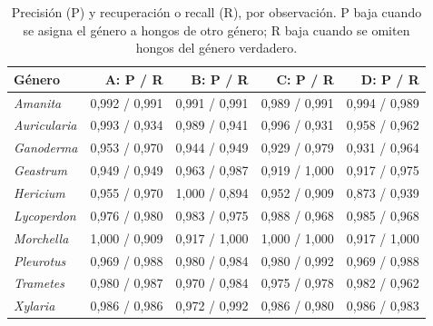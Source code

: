 \begin{table}[H]
\centering
\footnotesize
\caption{Precisión (P) y recuperación o recall (R), por observación. P baja cuando se asigna el género a hongos de otro género; R baja cuando se omiten hongos del género verdadero.}
\label{tab:precision-recall}
\begin{tabularx}{\linewidth}{Y r r r r}
\toprule
\textbf{Género} & \textbf{A: P / R} & \textbf{B: P / R} & \textbf{C: P / R} & \textbf{D: P / R}\\
\midrule
\textit{Amanita} & 0,992 / 0,991 & 0,991 / 0,991 & 0,989 / 0,991 & 0,994 / 0,989\\
\textit{Auricularia} & 0,993 / 0,934 & 0,989 / 0,941 & 0,996 / 0,931 & 0,958 / 0,962\\
\textit{Ganoderma} & 0,953 / 0,970 & 0,944 / 0,949 & 0,929 / 0,979 & 0,931 / 0,964\\
\textit{Geastrum} & 0,949 / 0,949 & 0,963 / 0,987 & 0,919 / 1,000 & 0,917 / 0,975\\
\textit{Hericium} & 0,955 / 0,970 & 1,000 / 0,894 & 0,952 / 0,909 & 0,873 / 0,939\\
\textit{Lycoperdon} & 0,976 / 0,980 & 0,983 / 0,975 & 0,988 / 0,968 & 0,985 / 0,968\\
\textit{Morchella} & 1,000 / 0,909 & 0,917 / 1,000 & 1,000 / 1,000 & 0,917 / 1,000\\
\textit{Pleurotus} & 0,969 / 0,988 & 0,980 / 0,984 & 0,980 / 0,992 & 0,969 / 0,988\\
\textit{Trametes} & 0,980 / 0,987 & 0,970 / 0,984 & 0,975 / 0,978 & 0,982 / 0,962\\
\textit{Xylaria} & 0,986 / 0,986 & 0,972 / 0,992 & 0,986 / 0,980 & 0,986 / 0,983\\
\bottomrule
\end{tabularx}
\end{table}

